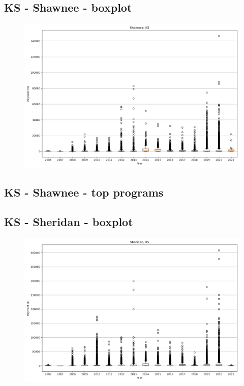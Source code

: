 \subsection*{KS - Shawnee - boxplot}
\begin{figure}[h]
\centering
\includegraphics[width=7in]{../output/boxplots/counties/Shawnee-KS_boxplot.png}
\end{figure}


\subsection*{KS - Shawnee - top programs}

\newpage
\subsection*{KS - Sheridan - boxplot}
\begin{figure}[h]
\centering
\includegraphics[width=7in]{../output/boxplots/counties/Sheridan-KS_boxplot.png}
\end{figure}


